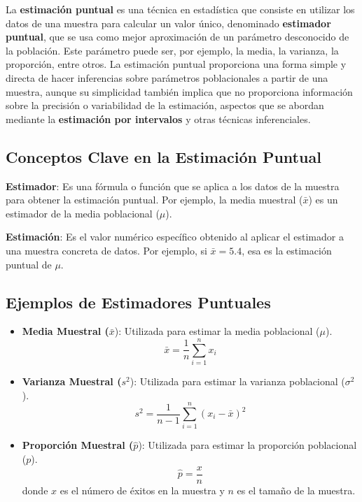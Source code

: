 \documentclass[
  letterpaper,
  DIV=11,
  numbers=noendperiod]{scrreprt}
\begin{document}
La \textbf{estimación puntual} es una técnica en estadística que
consiste en utilizar los datos de una muestra para calcular un valor
único, denominado \textbf{estimador puntual}, que se usa como mejor
aproximación de un parámetro desconocido de la población. Este parámetro
puede ser, por ejemplo, la media, la varianza, la proporción, entre
otros. La estimación puntual proporciona una forma simple y directa de
hacer inferencias sobre parámetros poblacionales a partir de una
muestra, aunque su simplicidad también implica que no proporciona
información sobre la precisión o variabilidad de la estimación, aspectos
que se abordan mediante la \textbf{estimación por intervalos} y otras
técnicas inferenciales.

\hypertarget{conceptos-clave-en-la-estimaciuxf3n-puntual}{%
\subsection{Conceptos Clave en la Estimación
Puntual}\label{conceptos-clave-en-la-estimaciuxf3n-puntual}}

\textbf{Estimador}: Es una fórmula o función que se aplica a los datos
de la muestra para obtener la estimación puntual. Por ejemplo, la media
muestral (\(\bar{x}\)) es un estimador de la media poblacional
(\(\mu\)).

\textbf{Estimación}: Es el valor numérico específico obtenido al aplicar
el estimador a una muestra concreta de datos. Por ejemplo, si
\(\bar{x} = 5.4\), esa es la estimación puntual de \(\mu\).

\hypertarget{ejemplos-de-estimadores-puntuales}{%
\subsection{Ejemplos de Estimadores
Puntuales}\label{ejemplos-de-estimadores-puntuales}}

\begin{itemize}
\item
  \textbf{Media Muestral (}\(\bar{x}\)): Utilizada para estimar la media
  poblacional (\(\mu\)). \[
  \bar{x} = \frac{1}{n} \sum_{i=1}^n x_i
  \]
\item
  \textbf{Varianza Muestral (}\(s^2\)): Utilizada para estimar la
  varianza poblacional (\(\sigma^2\)). \[
  s^2 = \frac{1}{n-1} \sum_{i=1}^n (x_i - \bar{x})^2
  \]
\item
  \textbf{Proporción Muestral (}\(\hat{p}\)): Utilizada para estimar la
  proporción poblacional (\(p\)). \[
  \hat{p} = \frac{x}{n}
  \] donde \(x\) es el número de éxitos en la muestra y \(n\) es el
  tamaño de la muestra.
\end{itemize}
\end{document}
